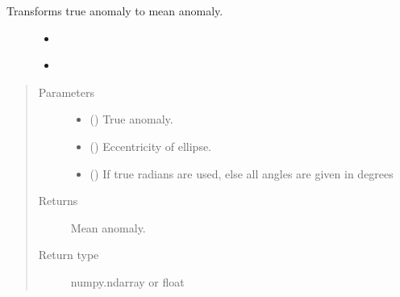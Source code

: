\documentclass[letterpaper,10pt,english]{sphinxmanual}
\begin{document}

\begin{fulllineitems}
\label{\detokenize{modules/dpt_tools:dpt_tools.true2mean}}
Transforms true anomaly to mean anomaly.
\begin{description}
\item[{}] \leavevmode\begin{itemize}
\item {} 
{\hyperref[\detokenize{modules/dpt_tools:dpt_tools.true2eccentric}]{}}

\item {} 
{\hyperref[\detokenize{modules/dpt_tools:dpt_tools.eccentric2mean}]{}}

\end{itemize}

\end{description}
\begin{quote}\begin{description}
\item[{Parameters}] \leavevmode\begin{itemize}
\item {} 
 () \textendash{} True anomaly.

\item {} 
 () \textendash{} Eccentricity of ellipse.

\item {} 
 () \textendash{} If true radians are used, else all angles are given in degrees

\end{itemize}

\item[{Returns}] \leavevmode
Mean anomaly.

\item[{Return type}] \leavevmode
numpy.ndarray or float

\end{description}\end{quote}

\end{fulllineitems}
\end{document}
